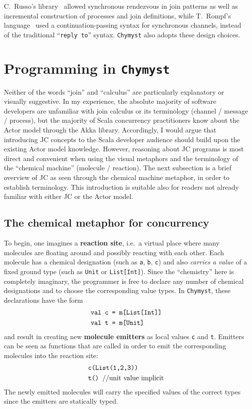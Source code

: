 \documentclass[sigplan,10pt,review,anonymous]{acmart}\settopmatter{printfolios=true}
\begin{document}
C.~Russo's library~\citep{Rus2007} allowed synchronous rendezvous
in join patterns as well as incremental construction of processes
and join definitions, while T.~Rompf's language~\citep{Rom2007}
used a continuation-passing syntax for synchronous channels, instead
of the traditional ``\texttt{reply to}'' syntax. \texttt{Chymyst}
also adopts these design choices.

\section{Programming in \texttt{Chymyst}}

Neither of the words ``join'' and ``calculus'' are particularly
explanatory or visually suggestive. In my experience, the absolute
majority of software developers are unfamiliar with join calculus
or its terminology (channel / message / process), but the majority
of Scala concurrency practitioners know about the Actor model through
the Akka library. Accordingly, I would argue that introducing JC concepts
to the Scala developer audience should build upon the existing Actor
model knowledge. However, reasoning about JC programs is most direct
and convenient when using the visual metaphors and the terminology
of the ``chemical machine'' (molecule / reaction). The next subsection
is a brief overview of JC as seen through the chemical machine metaphor,
in order to establish terminology. This introduction is suitable also
for readers not already familiar with either JC or the Actor model.

\subsection{The chemical metaphor for concurrency}

To begin, one imagines a \textbf{reaction site}, i.e.~a virtual place
where many molecules are floating around and possibly reacting with
each other. Each molecule has a chemical designation (such as \texttt{a},
\texttt{b}, \texttt{c}) and also \emph{carries a value} of a fixed
ground type (such as \texttt{Unit} or \texttt{List{[}Int{]}}). Since
the ``chemistry'' here is completely imaginary, the programmer is
free to declare any number of chemical designations and to choose
the corresponding value types. In \texttt{Chymyst}, these declarations
have the form
\begin{align*}
\text{\texttt{val c }} & \text{\texttt{= m[List[Int]]}}\\
\text{\texttt{val t }} & \text{\texttt{= m[Unit]}}
\end{align*}
and result in creating new \textbf{molecule emitters} as local values
\texttt{c} and \texttt{t}. Emitters can be seen as functions that
are called in order to emit the corresponding molecules into the reaction
site:
\begin{align*}
 & \text{\texttt{c(List(1,2,3))}}\\
 & \text{\texttt{t() }//unit value implicit}
\end{align*}
The newly emitted molecules will carry the specified values of the
correct types since the emitters are statically typed.
\end{document}
